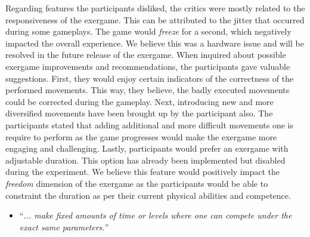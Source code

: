 Regarding features the participants disliked, the critics were mostly related to the responsiveness of the exergame. This can be attributed to the jitter that occurred during some gameplays. The game would \textit{freeze} for a second, which negatively impacted the overall experience. We believe this was a hardware issue and  will be resolved in the future release of the exergame. When inquired about possible exergame improvements and recommendations, the participants gave valuable suggestions. First, they would enjoy certain indicators of the correctness of the performed movements. This way, they believe, the badly executed movements could be corrected during the gameplay. Next, introducing new and more diversified movements have been brought up by the participant also. The participants stated that adding additional and more difficult movements one is require to perform as the game progresses would make the exergame more engaging and challenging. Lastly, participants would prefer an exergame with adjustable duration. This option has already been implemented but disabled during the experiment. We believe this feature would positively impact the \textit{freedom} dimension of the exergame as the participants would be able to constraint the duration as per their current physical abilities and competence.
\begin{itemize}
\item ``\textit{... make fixed amounts of time or levels where one can compete under the exact same parameters.}''
\end{itemize}
